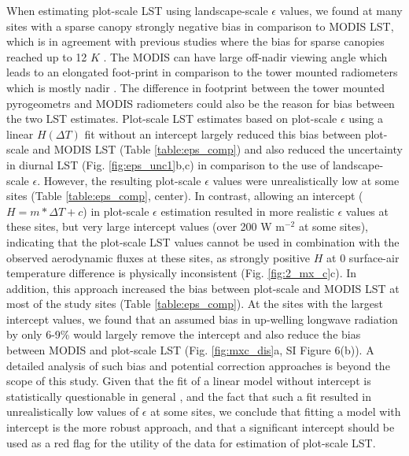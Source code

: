 \documentclass[fleqn,10pt]{wlscirep}
\begin{document}
When estimating plot-scale LST using landscape-scale $\epsilon$ values, we found at many sites with a sparse canopy strongly negative bias in comparison to MODIS LST, which is in agreement with previous studies where the bias for sparse canopies reached up to 12 $K$ \cite{guillevic2018land}. The MODIS can have large off-nadir viewing angle which leads to an elongated foot-print in comparison to the tower mounted radiometers which is mostly nadir \cite{marcolla2018geometry, margulis2019joint}. The difference in footprint between the tower mounted pyrogeometrs and MODIS radiometers could also be the reason for bias between the two LST estimates. Plot-scale LST estimates based on plot-scale $\epsilon$ using a linear $H(\Delta T)$ fit without an intercept largely reduced this bias between plot-scale and MODIS LST (Table \ref{table:eps_comp}) and also reduced the uncertainty in diurnal LST (Fig. \ref{fig:eps_unc1}b,c) in comparison to the use of landscape-scale $\epsilon$. However, the resulting plot-scale $\epsilon$ values were unrealistically low at some sites (Table \ref{table:eps_comp}, center). In contrast, allowing an intercept ($H=m*\Delta T + c$) in plot-scale $\epsilon$ estimation resulted in more realistic $\epsilon$ values at these sites, but very large intercept values (over 200 W m$^{-2}$ at some sites), indicating that the plot-scale LST values cannot be used in combination with the observed aerodynamic fluxes at these sites, as strongly positive $H$ at 0 surface-air temperature difference is physically inconsistent (Fig. \ref{fig:2_mx_c}c). In addition, this approach increased the bias between plot-scale and MODIS LST at most of the study sites (Table \ref{table:eps_comp}). At the sites with the largest intercept values, we found that an assumed bias in up-welling longwave radiation by only 6-9\% would largely remove the intercept and also reduce the bias between MODIS and plot-scale LST (Fig. \ref{fig:mxc_dis}a, SI Figure 6(b)). A detailed analysis of such bias and potential correction approaches is beyond the scope of this study. Given that the fit of a linear model without intercept is statistically questionable in general \cite{eisenhauer2003regression}, and the fact that such a fit resulted in unrealistically low values of $\epsilon$ at some sites, we conclude that fitting a model with intercept is the more robust approach, and that a significant intercept should be used as a red flag for the utility of the data for estimation of plot-scale LST. 
\end{document}
